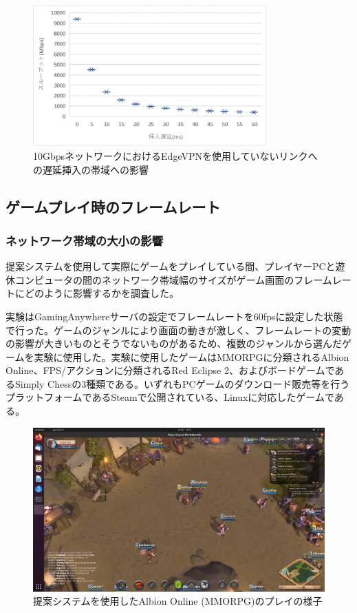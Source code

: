 \begin{figure}[h!]
    \centering
    \includegraphics[width=0.8\textwidth,keepaspectratio,clip]{img/band_withoutedge_vm.eps}
    \caption{10GbpsネットワークにおけるEdgeVPNを使用していないリンクへの遅延挿入の帯域への影響}
    \label{fig:band_withoutedge_vm}
\end{figure}

\subsection{ゲームプレイ時のフレームレート}

\subsubsection{ネットワーク帯域の大小の影響}
提案システムを使用して実際にゲームをプレイしている間、プレイヤーPCと遊休コンピュータの間のネットワーク帯域幅のサイズがゲーム画面のフレームレートにどのように影響するかを調査した。

実験はGamingAnywhereサーバの設定でフレームレートを60fpsに設定した状態で行った。ゲームのジャンルにより画面の動きが激しく、フレームレートの変動の影響が大きいものとそうでないものがあるため、複数のジャンルから選んだゲームを実験に使用した。実験に使用したゲームはMMORPGに分類されるAlbion Online\cite{albiononline}、FPS/アクションに分類されるRed Eclipse 2\cite{redeclipse}、およびボードゲームであるSimply Chess\cite{simplychess}の3種類である。いずれもPCゲームのダウンロード販売等を行うプラットフォームであるSteam\cite{steam}で公開されている、Linuxに対応したゲームである。

\begin{figure}[h!]
    \centering
    \includegraphics[width=\textwidth,keepaspectratio,clip]{img/screen_mmo.pdf}
    \caption{提案システムを使用したAlbion Online (MMORPG)のプレイの様子}
    \label{fig:screen_mmo}
\end{figure}

